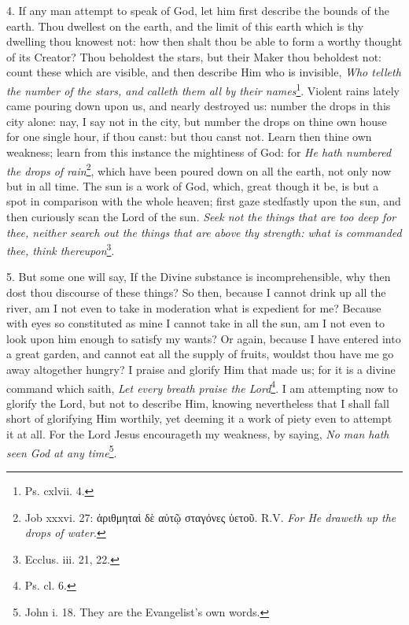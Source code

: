4. If any man attempt to speak of God, let him first describe the bounds of the earth. Thou dwellest on the earth, and the limit of this earth which is thy dwelling thou knowest not: how then shalt thou be able to form a worthy thought of its Creator? Thou beholdest the stars, but their Maker thou beholdest not: count these which are visible, and then describe Him who is invisible, \emph{Who telleth the number of the stars, and calleth them all by their names}\footnote{Ps. cxlvii. 4.}. Violent rains lately came pouring down upon us, and nearly destroyed us: number the drops in this city alone: nay, I say not in the city, but number the drops on thine own house for one single hour, if thou canst: but thou canst not. Learn then thine own weakness; learn from this instance the mightiness of God: for \emph{He hath numbered the drops of rain}\footnote{Job xxxvi. 27: \textgreek{ἀριθμηταὶ δὲ αὐτῷ σταγόνες ὑετοῦ}. \textsc{R.V.} \emph{For He draweth up the drops of water}.}, which have been poured down on all the earth, not only now but in all time. The sun is a work of God, which, great though it be, is but a spot in comparison with the whole heaven; first gaze stedfastly upon the sun, and then curiously scan the Lord of the sun. \emph{Seek not the things that are too deep for thee, neither search out the things that are above thy strength: what is commanded thee, think thereupon}\footnote{Ecclus. iii. 21, 22.}.

5. But some one will say, If the Divine substance is incomprehensible, why then dost thou discourse of these things? So then, because I cannot drink up all the river, am I not even to take in moderation what is expedient for me? Because with eyes so constituted as mine I cannot take in all the sun, am I not even to look upon him enough to satisfy my wants? Or again, because I have entered into a great garden, and cannot eat all the supply of fruits, wouldst thou have me go away altogether hungry? I praise and glorify Him that made us; for it is a divine command which saith, \emph{Let every breath praise the Lord}\footnote{Ps. cl. 6.}. I am attempting now to glorify the Lord, but not to describe Him, knowing nevertheless that I shall fall short of glorifying Him worthily, yet deeming it a work of piety even to attempt it at all. For the Lord Jesus encourageth my weakness, by saying, \emph{No man hath seen God at any time}\footnote{John i. 18. They are the Evangelist’s own words.}.

